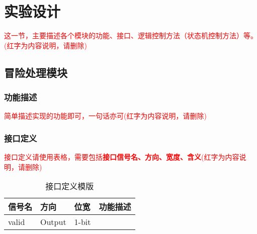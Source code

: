 \section{实验设计}
\textcolor{red}{这一节，主要描述各个模块的功能、接口、逻辑控制方法（状态机控制方法）等。(红字为内容说明，请删除)}
\subsection{冒险处理模块}\label{sub:hazard}
\subsubsection{功能描述}
\textcolor{red}{简单描述实现的功能即可，一句话亦可(红字为内容说明，请删除)}
\subsubsection{接口定义}
\textcolor{red}{接口定义请使用表格，需要包括\textbf{接口信号名、方向、宽度、含义}(红字为内容说明，请删除)}

\begin{table}[htp]
\caption{接口定义模版}\label{tab:signaldef}
\begin{center}
	\begin{tabular}{|l|l|l|p{6cm}|}
	\hline
	\textbf{信号名} & \textbf{方向} & \textbf{位宽} & \textbf{功能描述}\\ \hline \hline
	valid			& Output& 1-bit & \\ 
	\hline
	\end{tabular}
\end{center}
\end{table}
